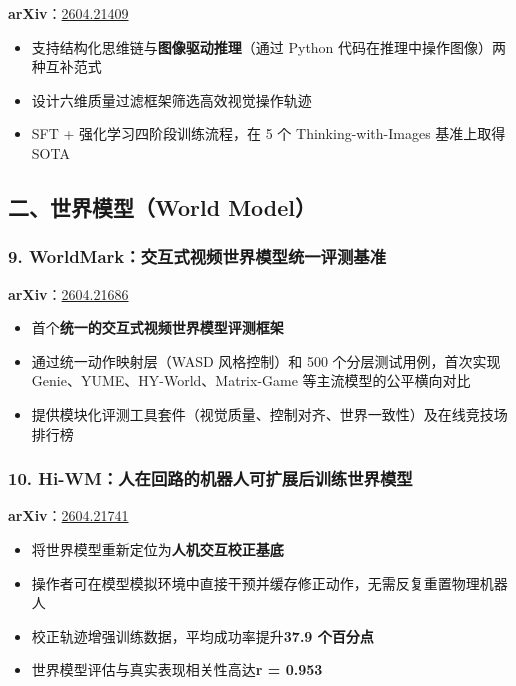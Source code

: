 \textbf{arXiv}：\href{https://arxiv.org/abs/2604.21409}{2604.21409}

\begin{itemize}[leftmargin=1.5em]
  \item 支持结构化思维链与\textbf{图像驱动推理}（通过 Python 代码在推理中操作图像）两种互补范式
  \item 设计六维质量过滤框架筛选高效视觉操作轨迹
  \item SFT + 强化学习四阶段训练流程，在 5 个 Thinking-with-Images 基准上取得 SOTA
\end{itemize}

\subsection{二、世界模型（World Model）}

\subsubsection{9. WorldMark：交互式视频世界模型统一评测基准}

\textbf{arXiv}：\href{https://arxiv.org/abs/2604.21686}{2604.21686}

\begin{itemize}[leftmargin=1.5em]
  \item 首个\textbf{统一的交互式视频世界模型评测框架}
  \item 通过统一动作映射层（WASD 风格控制）和 500 个分层测试用例，首次实现 Genie、YUME、HY-World、Matrix-Game 等主流模型的公平横向对比
  \item 提供模块化评测工具套件（视觉质量、控制对齐、世界一致性）及在线竞技场排行榜
\end{itemize}

\subsubsection{10. Hi-WM：人在回路的机器人可扩展后训练世界模型}

\textbf{arXiv}：\href{https://arxiv.org/abs/2604.21741}{2604.21741}

\begin{itemize}[leftmargin=1.5em]
  \item 将世界模型重新定位为\textbf{人机交互校正基底}
  \item 操作者可在模型模拟环境中直接干预并缓存修正动作，无需反复重置物理机器人
  \item 校正轨迹增强训练数据，平均成功率提升\textbf{37.9 个百分点}
  \item 世界模型评估与真实表现相关性高达\textbf{r = 0.953}
\end{itemize}

